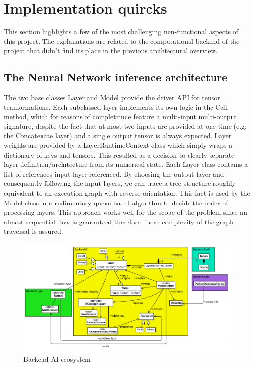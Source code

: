 \section{Implementation quircks}

This section highlights a few of the most challenging non-functional aspects of this project. The explanations are related to the computational backend of the project that didn't find its place in the previous arcihtectural overview.

\subsection{The Neural Network inference architecture}

The two base classes Layer and Model provide the driver API for tensor teanformations. Each subclassed layer implements its own logic in the Call method, which for reasons of completitude feature a multi-input multi-output signature, despite the fact that at most two inputs are provided at one time (e.g. the Concatenate layer) and a single output tensor is always expected. Layer weights are provided by a LayerRuntimeContext class which simply wraps a dictionary of keys and tensors. This resulted as a decision to clearly separate layer definition/architecture from its numerical state. Each Layer class contains a list of references input layer referenced. By choosing the output layer and consequently following the input layers, we can trace a tree structure roughly equivalent to an execution graph with reverse orientation. This fact is used by the Model class in a rudimentary queue-based algorithm to decide the order of processing layers. This approach works well for the scope of the problem since an almost sequential flow is guaranteed therefore linear complexity of the graph traversal is assured.

\begin{figure}[htbp]
	\centering
		\includegraphics[scale=0.6]{figures/diagram_backend_ai.png}
	\caption{Backend AI ecosystem}
        \label{FigDiagramAI}
\end{figure}

